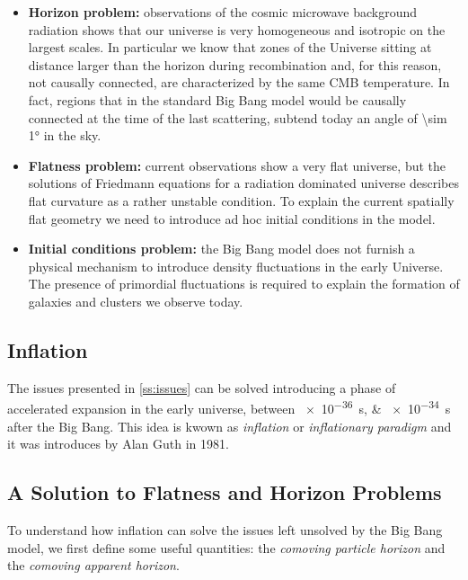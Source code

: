 \begin{itemize}
        \item \textbf{Horizon problem:} observations of the cosmic
        microwave background radiation shows that our universe is very
        homogeneous and isotropic on the largest scales. In particular we
        know that zones of the Universe sitting at distance larger than the
        horizon during recombination and, for this reason, not causally
        connected, are characterized by the same CMB temperature.
        In fact, regions that in the standard Big Bang model would be causally
        connected at the time of the last scattering, subtend today an
        angle of \ang{\sim 1} in the sky.

        \item \textbf{Flatness problem:} current observations show a very
        flat universe, but the solutions of Friedmann equations for a
        radiation dominated universe describes flat curvature as a rather
        unstable condition. To explain the current spatially flat geometry
        we need to introduce ad hoc initial conditions in the model.

        \item \textbf{Initial conditions problem:} the Big Bang model
        does not furnish a physical mechanism to introduce density
        fluctuations in the early Universe. The presence of primordial
        fluctuations is required to explain the formation of galaxies and
        clusters we observe today.
\end{itemize}

\subsection{Inflation}

The issues presented in \autoref{ss:issues} can be solved introducing a
phase of accelerated expansion in the early universe, between
\SIlist{e-36;e-34}{\second} after the Big Bang. This idea is kwown as
\emph{inflation} or \emph{inflationary paradigm} and it was introduces by
Alan Guth in 1981.

\subsection{A Solution to Flatness and Horizon Problems}

To understand how inflation can solve the issues left unsolved by the Big Bang
model, we first define some useful quantities: the \emph{comoving particle
horizon} and the \emph{comoving apparent horizon}.

